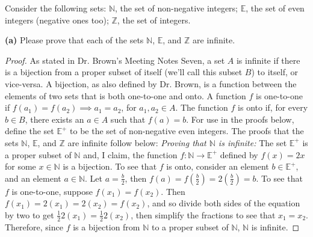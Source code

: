 \documentclass[12pt]{article}
\newenvironment{problem}[2][Problem]{\begin{trivlist}
\item[\hskip \labelsep {\bfseries #1}\hskip \labelsep {\bfseries #2.}]}{\end{trivlist}}
\begin{document}
\newpage
\begin{problem}{2}
Consider the following sets: $\mathbb{N}$, the set of non-negative integers; $\mathbb{E}$, the set of even integers (negative ones too); $\mathbb{Z}$, the set of integers.
\begin{description}
\item \textbf{(a)} Please prove that each of the sets $\mathbb{N}$, $\mathbb{E}$, and $\mathbb{Z}$ are infinite.
\end{description}
\end{problem}

\begin{proof}
As stated in Dr. Brown's Meeting Notes Seven, a set $A$ is infinite if there is a bijection from a proper subset of itself (we'll call this subset $B$) to itself, or vice-versa. A bijection, as also defined by Dr. Brown, is a function between the elements of two sets that is both one-to-one and onto. A function $f$ is one-to-one if $f(a_1) = f(a_2) \implies a_1 = a_2$, for $a_1,a_2 \in A$. The function $f$ is onto if, for every $b \in B$, there exists an $a \in A$ such that $f(a) = b$. For use in the proofs below, define the set $\mathbb{E}^+$ to be the set of non-negative even integers. The proofs that the sets $\mathbb{N}$, $\mathbb{E}$, and $\mathbb{Z}$ are infinite follow below:
\newline
\newline
\textit{Proving that $\mathbb{N}$ is infinite:} The set $\mathbb{E}^+$ is a proper subset of $\mathbb{N}$ and, I claim, the function $f:\mathbb{N} \rightarrow \mathbb{E}^+$ defined by $f(x)=2x$ for some $x \in\mathbb{N}$ is a bijection. To see that $f$ is onto, consider an element $b \in\mathbb{E}^+$, and an element $a \in\mathbb{N}$. Let $a=\frac{b}{2}$, then $f(a)=f(\frac{b}{2})=2(\frac{b}{2}) = b$. To see that $f$ is one-to-one, suppose $f(x_1)=f(x_2)$. Then $f(x_1)=2(x_1) = 2(x_2) = f(x_2)$, and so divide both sides of the equation by two to get $\frac{1}{2}2(x_1) = \frac{1}{2}2(x_2)$, then simplify the fractions to see that $x_1=x_2$. Therefore, since $f$ is a bijection from $\mathbb{N}$ to a proper subset of $\mathbb{N}$, $\mathbb{N}$ is infinite.
\newline
\newline

\end{proof}
\end{document}
